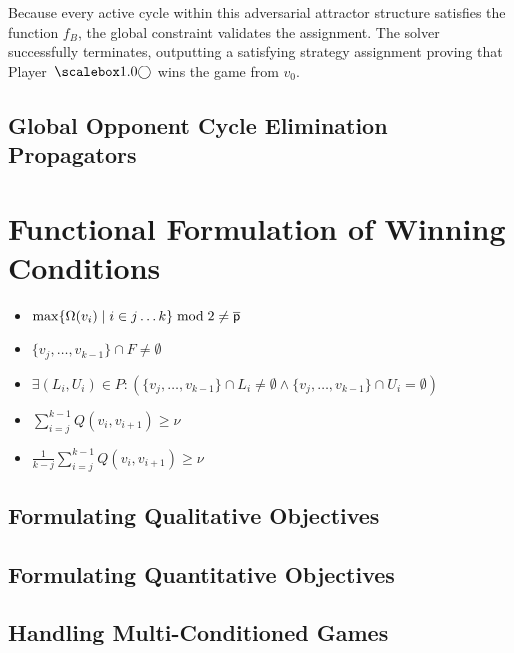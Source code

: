 \documentclass[preprint,12pt,authoryear]{elsarticle}
\begin{document}
Because every active cycle within this adversarial attractor structure satisfies the function $f_B$, the global constraint validates the assignment. The solver successfully terminates, outputting a satisfying strategy assignment proving that Player~$\even$ wins the game from $v_0$.




\subsection{Global Opponent Cycle Elimination Propagators}\label{sec:global_propagators}

\section{Functional Formulation of Winning Conditions}\label{sec:function_conditions}
\begin{itemize}[leftmargin=3.1cm, labelwidth=2.8cm, align=right, itemsep=0.5ex, parsep=0pt, topsep=1pt]
    \item [$f_\omega(v_j, \closerdots, v_k) =$] $\max\{\Omega(v_i) \mid i\in j\dots k\} \bmod 2 \ne \overline{\mathsf{p}}$
    \item [$f_B(v_j, \closerdots, v_k) =$] $\{v_j, \dots, v_{k-1}\} \cap F \neq \emptyset$
    \item [$f_R(v_j, \closerdots, v_k) =$] $\exists (L_i, U_i) \in P : \left( \{v_j, \dots, v_{k-1}\} \cap L_i \neq \emptyset \land \{v_j, \dots, v_{k-1}\} \cap U_i = \emptyset \right)$
    \item [$f_\eta(v_j, \closerdots, v_k) =$] $\sum_{i=j}^{k-1} Q(v_i, v_{i+1}) \ge \nu$
    \item [$f_\mu(v_j, \closerdots, v_k) =$] $\frac{1}{k-j} \sum_{i=j}^{k-1} Q(v_i, v_{i+1}) \ge \nu$
\end{itemize}

\subsection{Formulating Qualitative Objectives}\label{subsec:cp_qualitative}
\subsection{Formulating Quantitative Objectives}\label{subsec:cp_quantitative}
\subsection{Handling Multi-Conditioned Games}\label{subsec:multi_conditioned}
\end{document}
